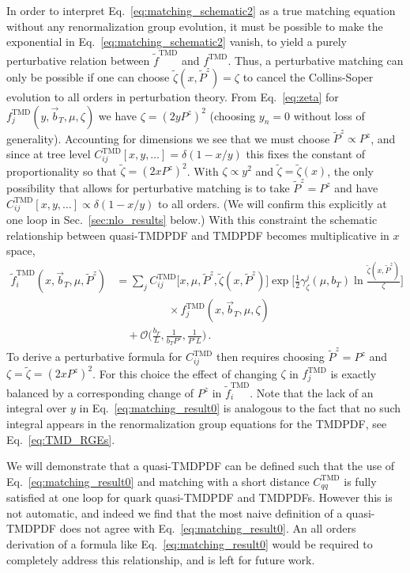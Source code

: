 \documentclass[11pt,a4paper]{article}
\DeclareRobustCommand{\eq}[1]{Eq.~\eqref{eq:#1}}
\DeclareRobustCommand{\sec}[1]{Sec.~\ref{sec:#1}}
\newcommand{\cO}{\mathcal{O}}
\newcommand{\nn}{\nonumber}
\newcommand\TMD{\mathrm{TMD}}
\newcommand{\bt}{\vec b_T}
\begin{document}
In order to interpret \eq{matching_schematic2} as a true matching equation without any renormalization group evolution, it must be possible to make the exponential in \eq{matching_schematic2} vanish, to yield a purely perturbative relation between $\tilde f^\TMD$ and $f^\TMD$.
Thus, a perturbative matching can only be possible if one can choose $\tilde\zeta(x,\tilde P^z) = \zeta$ to cancel the Collins-Soper evolution to all orders in perturbation theory.  From \eq{zeta} for $f_j^\TMD(y,\bt,\mu,\zeta)$  we have $\zeta = (2 y P^z)^2$ (choosing $y_n=0$ without loss of generality). Accounting for dimensions we see that we must choose $\tilde P^z \propto P^z$, and since at tree level $C_{ij}^\TMD[x,y,\ldots] = \delta(1-x/y)$ this fixes the constant of proportionality so that $\tilde\zeta = (2 x P^z)^2$. With $\zeta\propto y^2$ and $\tilde\zeta=\tilde\zeta(x)$, the only possibility that allows for perturbative matching is to take $\tilde P^z=P^z$ and have $C_{ij}^\TMD[x,y,\ldots] \propto \delta(1-x/y)$ to all orders. (We will confirm this explicitly at one loop in \sec{nlo_results} below.)
With this constraint the schematic relationship between quasi-TMDPDF and TMDPDF becomes multiplicative in $x$ space,
\begin{align} \label{eq:matching_result0}
\tilde f_{i}^\TMD(x, \bt, \mu, \tilde P^z) &
 = \sum_j  C^\TMD_{ij}\bigl[x, \mu, \tilde P^z, \tilde \zeta(x,\tilde P^z)\bigr]
\exp\biggl[\frac12 \gamma_\zeta^j(\mu,b_T) \ln\frac{\tilde \zeta(x,\tilde P^z)}{\zeta} \biggr]
\nn\\&\hspace{2cm}\times
f^\TMD_{j}(x, \bt, \mu, \zeta)
\nn\\&\quad
 + \cO\biggl(\frac{b_T}{L}, \frac{1}{b_T P^z}, \frac{1}{P^z L}\biggr)
\,.\end{align}
To derive a perturbative formula for $C^\TMD_{ij}$ then requires choosing $\tilde P^z=P^z$ and $\zeta = \tilde \zeta = (2 x P^z)^2$. For this choice the effect of changing $\zeta$ in $f^\TMD_j$ is exactly balanced by a corresponding change of $P^z$ in $\tilde f_i^\TMD$. Note that the lack of an integral over $y$ in \eq{matching_result0} is analogous to the fact that no such integral appears in the renormalization group equations for the TMDPDF, see \eq{TMD_RGEs}. 

We will demonstrate that a quasi-TMDPDF can be defined such that the use of \eq{matching_result0} and matching with a short distance $C^\TMD_{qq}$ is  fully satisfied at one loop for quark quasi-TMDPDF and TMDPDFs.
However this is not automatic, and indeed we find that the most naive definition of a quasi-TMDPDF does not agree with \eq{matching_result0}.
An all orders derivation of a formula like \eq{matching_result0} would be  required to completely address this relationship, and is left for future work.
\end{document}
